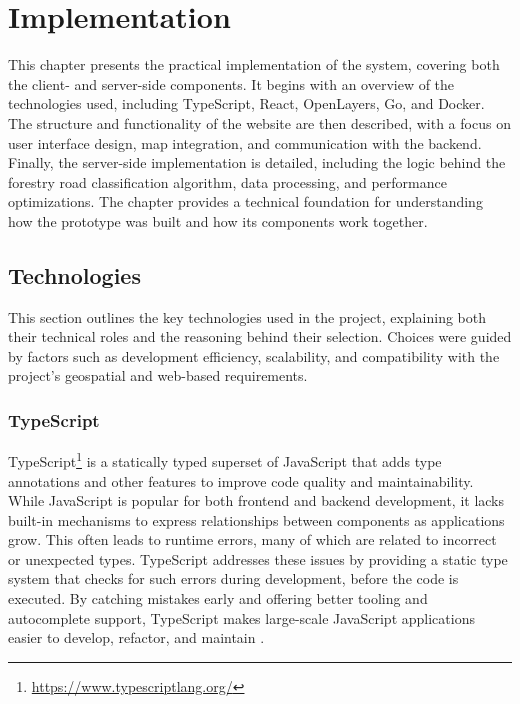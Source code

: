 \chapter{Implementation}\label{chap:implementation}

This chapter presents the practical implementation of the system, covering both the client- and server-side components. It begins with an overview of the technologies used, including TypeScript, React, OpenLayers, Go, and Docker. The structure and functionality of the website are then described, with a focus on user interface design, map integration, and communication with the backend. Finally, the server-side implementation is detailed, including the logic behind the forestry road classification algorithm, data processing, and performance optimizations. The chapter provides a technical foundation for understanding how the prototype was built and how its components work together.


\section{Technologies}

This section outlines the key technologies used in the project, explaining both their technical roles and the reasoning behind their selection. Choices were guided by factors such as development efficiency, scalability, and compatibility with the project's geospatial and web-based requirements.

\subsection{TypeScript}

TypeScript\footnote{\url{https://www.typescriptlang.org/}} is a statically typed superset of JavaScript that adds type annotations and other features to improve code quality and maintainability. While JavaScript is popular for both frontend and backend development, it lacks built-in mechanisms to express relationships between components as applications grow. This often leads to runtime errors, many of which are related to incorrect or unexpected types. TypeScript addresses these issues by providing a static type system that checks for such errors during development, before the code is executed. By catching mistakes early and offering better tooling and autocomplete support, TypeScript makes large-scale JavaScript applications easier to develop, refactor, and maintain \cite{typescript_handbook}. 

